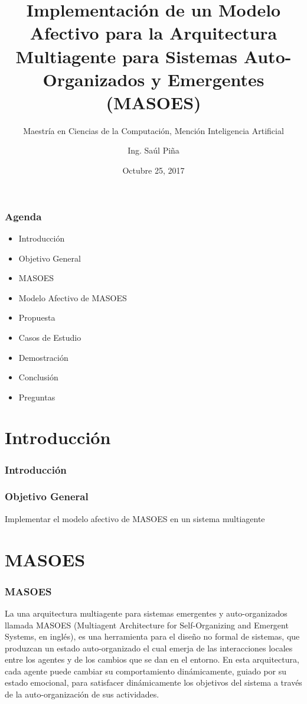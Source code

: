 \documentclass{beamer}
\title{Implementación de un Modelo Afectivo para la Arquitectura Multiagente para Sistemas Auto-Organizados y Emergentes (MASOES)}
\subtitle{Maestría en Ciencias de la Computación, Mención Inteligencia Artificial}
\author{Ing. Saúl Piña}
\date{Octubre 25, 2017}
\institute{\url{sauljabin@gmail.com}}
\begin{document}
\begin{frame}[plain,t]
\titlepage
\end{frame}

\begin{frame}
\frametitle{Agenda}
\begin{itemize}
\item Introducción
\item Objetivo General
\item MASOES
\item Modelo Afectivo de MASOES
\item Propuesta
\item Casos de Estudio
\item Demostración
\item Conclusión
\item Preguntas
\end{itemize}
\end{frame}

\section{Introducción}

\begin{frame}
\frametitle{Introducción}

\end{frame}

\begin{frame}
\frametitle{Objetivo General}
\huge
Implementar el modelo afectivo de MASOES en un sistema multiagente
\end{frame}

\section{MASOES}

\begin{frame}
\frametitle{MASOES}
La una arquitectura multiagente para sistemas emergentes y auto-organizados llamada
MASOES (Multiagent Architecture for Self-Organizing and Emergent Systems, en inglés),
es una herramienta para el diseño no
formal de sistemas, que produzcan un estado auto-organizado el cual emerja de
las interacciones locales entre los agentes y de los cambios que se dan en el
entorno. En esta arquitectura, cada agente puede cambiar su comportamiento
dinámicamente, guiado por su estado emocional, para satisfacer dinámicamente los
objetivos del sistema a través de la auto-organización de sus actividades.
\end{frame}
\end{document}
